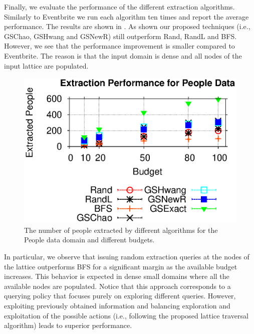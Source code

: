 Finally, we evaluate the performance of the different extraction algorithms. Similarly to Eventbrite we run each algorithm ten times and report the average performance. The results are shown in . As shown our proposed techniques (i.e., GSChao, GSHwang and GSNewR) still outperform Rand, RandL and BFS. However, we see that the performance improvement is smaller compared to Eventbrite. The reason is that the input domain is dense and all nodes of the input lattice are populated. 

\begin{figure}[h]
	\vspace{-10pt}
	\begin{center}
	\includegraphics[clip,scale=0.5]{figs/poExtraction.eps}
	\caption{The number of people extracted by different algorithms for the People data domain and different budgets.}
	\label{fig:poextraction}
	\end{center}
	\vspace{-10pt}
\end{figure}

In particular, we observe that issuing random extraction queries at the nodes of the lattice outperforms BFS for a significant margin as the available budget increases. This behavior is expected in dense small domains where all the available nodes are populated. Notice that this approach corresponds to a querying policy that focuses purely on exploring different queries. However, exploiting previously obtained information and balancing exploration and exploitation of the possible actions (i.e., following the proposed lattice traversal algorithm) leads to superior performance. 


